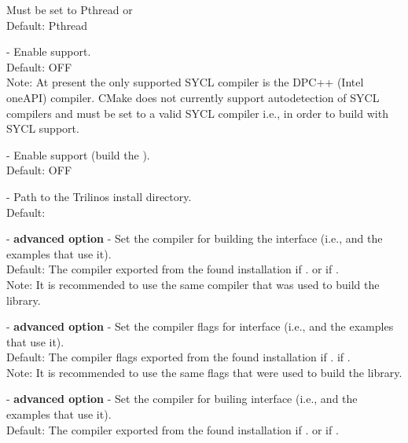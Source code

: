 \begin{description}
  Must be set to Pthread or {\openmp}
  \\
  Default: Pthread
\item[\id{ENABLE\_SYCL}] -
  Enable {\sycl} support.
  \\
  Default: OFF
  \\
  Note: At present the only supported SYCL compiler is the DPC++ (Intel oneAPI)
  compiler. CMake does not currently support autodetection of SYCL compilers and
   must be set to a valid SYCL compiler i.e.,
   in order to build with SYCL support.
\item[\id{ENABLE\_TRILINOS}] -
  Enable {\trilinos} support (build the {\tpetra} {\nvector}).
  \\
  Default: OFF
\item[\id{Trilinos\_DIR}] -
  Path to the Trilinos install directory.
  \\
  Default:
\item[\id{TRILINOS\_INTERFACE\_C\_COMPILER}] - \textbf{advanced option} -
  Set the {\CC} compiler for building the {\trilinos} interface
  (i.e., {\nvectrilinos} and the examples that use it).
  \\
  Default: The {\CC} compiler exported from the found {\trilinos} installation
  if .  or  if .
  \\
  Note: It is recommended to use the same compiler that was used to build the {\trilinos} library.
\item[\id{TRILINOS\_INTERFACE\_C\_COMPILER\_FLAGS}] - \textbf{advanced option} -
  Set the {\CC} compiler flags for {\trilinos} interface
  (i.e., {\nvectrilinos} and the examples that use it).
  \\
  Default: The {\CC} compiler flags exported from the found {\trilinos} installation
  if .  if .
  \\
  Note: It is recommended to use the same flags that were used to build the {\trilinos} library.
\item[\id{TRILINOS\_INTERFACE\_CXX\_COMPILER}] - \textbf{advanced option} -
  Set the {\CPP} compiler for builing {\trilinos} interface
  (i.e., {\nvectrilinos} and the examples that use it).
  \\
  Default: The {\CPP} compiler exported from the found {\trilinos} installation
  if .  or  if .

\end{description}
